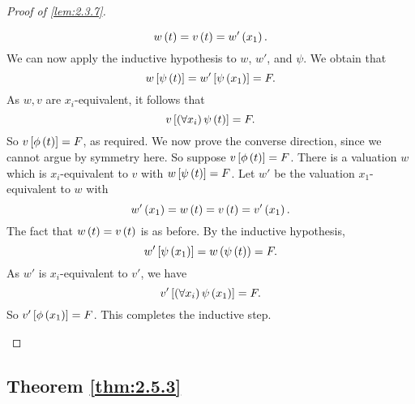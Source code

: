 \begin{proof}[Proof of \ref{lem:2.3.7}]
\begin{itemize}
$$ w\left( t \right) = v\left( t \right) = w'\left( x_1 \right). $$
We can now apply the inductive hypothesis to $ w $, $ w' $, and $ \psi $. We obtain that
$$ w\left[ \psi\left( t \right) \right] = w'\left[ \psi\left( x_1 \right) \right] = F. $$
As $ w, v $ are $ x_i $-equivalent, it follows that
$$ v\left[ \left( \forall x_i \right)\psi\left( t \right) \right] = F. $$
So $ v\left[ \phi\left( t \right) \right] = F $, as required. We now prove the converse direction, since we cannot argue by symmetry here. So suppose $ v\left[ \phi\left( t \right) \right] = F $. There is a valuation $ w $ which is $ x_i $-equivalent to $ v $ with $ w\left[ \psi\left( t \right) \right] = F $. Let $ w' $ be the valuation $ x_1 $-equivalent to $ w $ with
$$ w'\left( x_1 \right) = w\left( t \right) = v\left( t \right) = v'\left( x_1 \right). $$
The fact that $ w\left( t \right) = v\left( t \right) $ is as before. By the inductive hypothesis,
$$ w'\left[ \psi\left( x_1 \right) \right] = w\left( \psi\left( t \right) \right) = F. $$
As $ w' $ is $ x_i $-equivalent to $ v' $, we have
$$ v'\left[ \left( \forall x_i \right)\psi\left( x_1 \right) \right] = F. $$
So $ v'\left[ \phi\left( x_1 \right) \right] = F $. This completes the inductive step.
\end{itemize}
\end{proof}

\pagebreak

\subsection{Theorem \ref{thm:2.5.3}}

